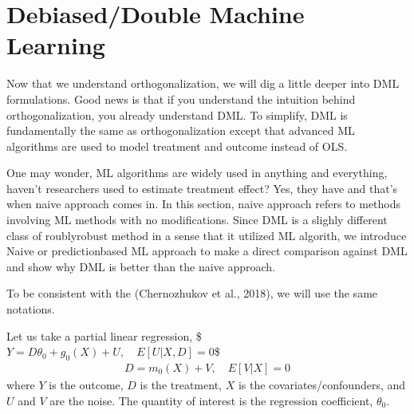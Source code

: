 \documentclass[letterpaper,10pt,english]{jupyterBook}
\begin{document}
\section{Debiased/Double Machine Learning}
\label{\detokenize{orthogonal_DML:debiased-double-machine-learning}}
\sphinxAtStartPar
Now that we understand orthogonalization, we will dig a little deeper into DML formulations. Good news is that if you understand the intuition behind orthogonalization, you already understand DML. To simplify, DML is fundamentally the same as orthogonalization except that advanced ML algorithms are used to model treatment and outcome instead of OLS.

\sphinxAtStartPar
One may wonder, ML algorithms are widely used in anything and everything, haven’t researchers used to estimate treatment effect? Yes, they have and that’s when naive approach comes in. In this section, naive approach refers to methods involving ML methods with no modifications. Since DML is a slighly different class of roubly\sphinxhyphen{}robust method in a sense that it utilized ML algorith, we introduce Naive or prediction\sphinxhyphen{}based ML approach to make a direct comparison against DML and show why DML is better than the naive approach.

\sphinxAtStartPar
To be consistent with the (Chernozhukov et al., 2018), we will use the same notations.

\sphinxAtStartPar
Let us take a partial linear regression,
\$\(Y = D\theta_0 + g_0(X) + U, \quad E[U|X, D] = 0 \)\$
\begin{equation*}
\begin{split}D = m_0(X) + V, \quad E[V|X] = 0\end{split}
\end{equation*}
\sphinxAtStartPar
where \(Y\) is the outcome, \(D\) is the treatment, \(X\) is the covariates/confounders, and \(U\) and \(V\) are the noise. The quantity of interest is the regression coefficient, \(\theta_0\).
\end{document}
